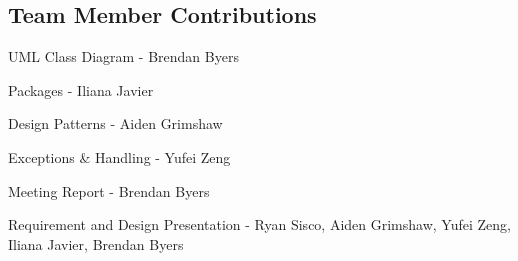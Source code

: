 \documentclass[12pt]{article}
\begin{document}
\subsection{Team Member Contributions}

UML Class Diagram - Brendan Byers

Packages - Iliana Javier

Design Patterns - Aiden Grimshaw

Exceptions \& Handling - Yufei Zeng

Meeting Report - Brendan Byers

Requirement and Design Presentation - Ryan Sisco, Aiden Grimshaw, Yufei Zeng, Iliana Javier, Brendan Byers 
\end{document}
